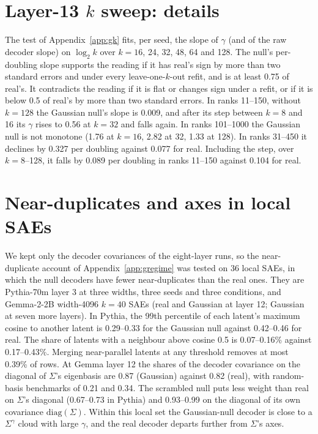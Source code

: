 \documentclass[10pt,twocolumn]{article}
\newcommand{\Sig}{\Sigma}
\begin{document}
\section{Layer-13 $k$ sweep: details}
\label{app:ksweep}

The test of Appendix~\ref{app:gk} fits, per seed, the slope of $\gamma$ (and of the raw decoder slope) on $\log_2 k$ over $k=16$, 24, 32, 48, 64 and 128. The null's per-doubling slope supports the reading if it has real's sign by more than two standard errors and under every leave-one-$k$-out refit, and is at least 0.75 of real's. It contradicts the reading if it is flat or changes sign under a refit, or if it is below 0.5 of real's by more than two standard errors. In ranks 11--150, without $k=128$ the Gaussian null's slope is 0.009, and after its step between $k=8$ and 16 its $\gamma$ rises to 0.56 at $k=32$ and falls again. In ranks 101--1000 the Gaussian null is not monotone (1.76 at $k=16$, 2.82 at 32, 1.33 at 128). In ranks 31--450 it declines by 0.327 per doubling against 0.077 for real. Including the step, over $k=8$--128, it falls by 0.089 per doubling in ranks 11--150 against 0.104 for real.

\section{Near-duplicates and axes in local SAEs}
\label{app:regime}

We kept only the decoder covariances of the eight-layer runs, so the near-duplicate account of Appendix~\ref{app:gregime} was tested on 36 local SAEs, in which the null decoders have fewer near-duplicates than the real ones. They are Pythia-70m layer 3 at three widths, three seeds and three conditions, and Gemma-2-2B width-4096 $k=40$ SAEs (real and Gaussian at layer 12; Gaussian at seven more layers). In Pythia, the 99th percentile of each latent's maximum cosine to another latent is 0.29--0.33 for the Gaussian null against 0.42--0.46 for real. The share of latents with a neighbour above cosine 0.5 is 0.07--0.16\% against 0.17--0.43\%. Merging near-parallel latents at any threshold removes at most 0.39\% of rows. At Gemma layer 12 the shares of the decoder covariance on the diagonal of $\Sig$'s eigenbasis are 0.87 (Gaussian) against 0.82 (real), with random-basis benchmarks of 0.21 and 0.34. The scrambled null puts less weight than real on $\Sig$'s diagonal (0.67--0.73 in Pythia) and 0.93--0.99 on the diagonal of its own covariance $\mathrm{diag}(\Sig)$. Within this local set the Gaussian-null decoder is close to a $\Sig^{\gamma}$ cloud with large $\gamma$, and the real decoder departs further from $\Sig$'s axes.
\end{document}
